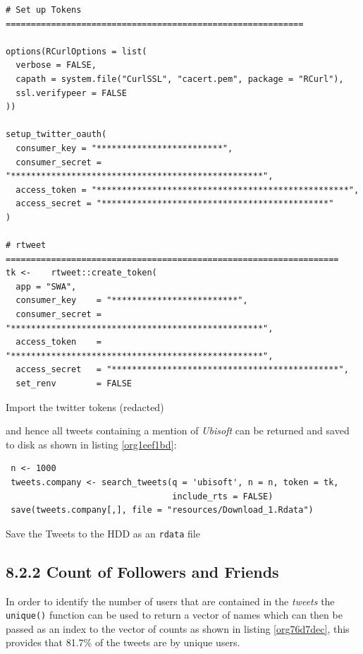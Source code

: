\documentclass[11pt]{article}
\begin{document}
\begin{listing}[htbp]
\begin{verbatim}
# Set up Tokens ===========================================================

options(RCurlOptions = list(
  verbose = FALSE,
  capath = system.file("CurlSSL", "cacert.pem", package = "RCurl"),
  ssl.verifypeer = FALSE
))

setup_twitter_oauth(
  consumer_key = "*************************",
  consumer_secret = "**************************************************",
  access_token = "**************************************************",
  access_secret = "*********************************************"
)

# rtweet ==================================================================
tk <-    rtweet::create_token(
  app = "SWA",
  consumer_key    = "*************************",
  consumer_secret = "**************************************************",
  access_token    = "**************************************************",
  access_secret   = "*********************************************",
  set_renv        = FALSE
\end{verbatim}
\caption{\label{org7702bd1}Import the twitter tokens (redacted)}
\end{listing}

and hence all tweets containing a mention of \emph{Ubisoft} can be returned and saved to disk as shown in listing \ref{org1eef1bd}:

\begin{listing}[htbp]
\begin{verbatim}
 n <- 1000
 tweets.company <- search_tweets(q = 'ubisoft', n = n, token = tk,
                                 include_rts = FALSE)
 save(tweets.company[,], file = "resources/Download_1.Rdata")
\end{verbatim}
\caption{\label{org1eef1bd}Save the Tweets to the HDD as an \texttt{rdata} file}
\end{listing}

\subsection{8.2.2 Count of Followers and Friends}
\label{sec:org78c67be}
In order to identify the number of users that are contained in the \emph{tweets} the
\texttt{unique()} function can be used to return a vector of names which can then be passed as an index to the vector of counts as shown in listing \ref{org76d7dec}, this provides that 81.7\% of the tweets are by unique users.
\end{document}
